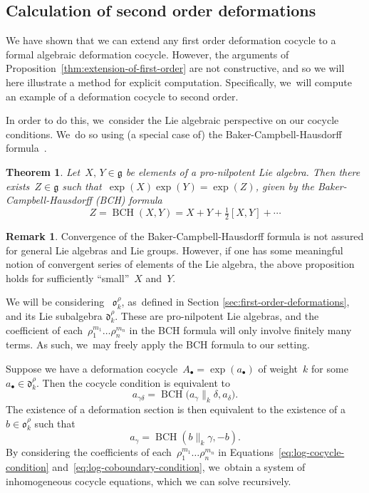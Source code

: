 \documentclass[JEP,XML,SOM,Unicode,published]{cedram}
\let\oldbullet\bullet
\renewcommand{\bullet}{{\scriptscriptstyle\oldbullet}}
\theoremstyle{plain}
\newtheorem{theorem}[theoremcounter]{Theorem}
\theoremstyle{definition}
\newtheorem{remark}[theoremcounter]{Remark}
\newcommand{\tx}{\text}
\newcommand{\frakd}{\ensuremath{\mathfrak{d}}}
\newcommand{\frakg}{\ensuremath{\mathfrak{g}}}
\newcommand{\frako}{\ensuremath{\mathfrak{o}}}
\let\ga\gamma
\DeclareMathOperator{\BCH}{BCH}
\begin{document}
\subsection{Calculation of second order deformations}
\label{ssec:calculation_of_second_order_deformations}

We have shown that we can extend any first order deformation cocycle to a formal algebraic deformation cocycle. However, the arguments of Proposition~\ref{thm:extension-of-first-order} are not constructive, and so we will here illustrate a method for explicit computation. Specifically, we~will compute an example of a deformation cocycle to second order.

In order to do this, we~consider the Lie algebraic perspective on our cocycle conditions. We~do so using (a special case of) the Baker-Campbell-Hausdorff formula~\cite{dynkin47,bourbaki72}.

\begin{theorem}
Let~$X,\,Y\in\frakg$ be elements of a pro-nilpotent Lie algebra. Then there exists~$Z\in\frakg$ such that~$\exp(X) \exp(Y) = \exp(Z)$, given by the Baker-Campbell-Hausdorff (BCH) formula
\begin{equation}\label{eq:bch}
Z=\BCH(X,Y)=X + Y +\tfrac{1}{2}[X,Y]+\cdots
\end{equation}
\end{theorem}

\begin{remark}
Convergence of the Baker-Campbell-Hausdorff formula is not assured for general Lie algebras and Lie groups. However, if one has some meaningful notion of convergent series of elements of the Lie algebra, the above proposition holds for sufficiently ``small''~$X$ and~$Y$.
\end{remark}

We will be considering ~$\frako_k^\rho$, as~defined in Section \ref{sec:first-order-deformations}, and its Lie subalgebra $\frakd_k^\rho$. These are pro-nilpotent Lie algebras, and the coefficient of each~$\rho_1^{m_1}\ldots \rho_n^{m_n}$ in the BCH formula will only involve finitely many terms. As such, we~may freely apply the BCH formula to our setting.

Suppose we have a deformation cocycle~$A_\bullet = \exp(a_\bullet)$ of weight~$k$ for some~$a_\bullet\in\frakd_k^\rho$. Then the cocycle condition is equivalent to\vspace*{-3pt}
\begin{equation}\label{eq:log-cocycle-condition}
a_{\ga\delta} = \BCH\bigl(a_\ga\big\|_k\delta,a_\delta \bigr)
\tx{.}
\end{equation}
The existence of a deformation section is then equivalent to the existence of a~$b\in\frako_k^\rho$ such that\vspace*{-3pt}
\begin{equation}\label{eq:log-coboundary-condition}
a_\ga = \BCH(b\big\|_k\ga,-b)\tx{.}
\end{equation}
By considering the coefficients of each~$\rho_1^{m_1}\ldots\rho_n^{m_n}$ in Equations~\eqref{eq:log-cocycle-condition} and~\eqref{eq:log-coboundary-condition}, we~obtain a system of inhomogeneous cocycle equations, which we can solve recursively.
\end{document}
